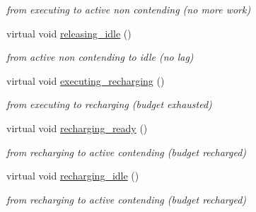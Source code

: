 \begin{DoxyCompactItemize}
\begin{DoxyCompactList}\small\item\em from executing to active non contending (no more work) \end{DoxyCompactList}\item 
virtual void \hyperlink{classRTSim_1_1PollingServer_acc8d9a98cd49bb715979e2f9a9b376b1}{releasing\+\_\+idle} ()\hypertarget{classRTSim_1_1PollingServer_acc8d9a98cd49bb715979e2f9a9b376b1}{}\label{classRTSim_1_1PollingServer_acc8d9a98cd49bb715979e2f9a9b376b1}

\begin{DoxyCompactList}\small\item\em from active non contending to idle (no lag) \end{DoxyCompactList}\item 
virtual void \hyperlink{classRTSim_1_1PollingServer_a4deb0880a4db27809b68c0cb978e23ed}{executing\+\_\+recharging} ()\hypertarget{classRTSim_1_1PollingServer_a4deb0880a4db27809b68c0cb978e23ed}{}\label{classRTSim_1_1PollingServer_a4deb0880a4db27809b68c0cb978e23ed}

\begin{DoxyCompactList}\small\item\em from executing to recharging (budget exhausted) \end{DoxyCompactList}\item 
virtual void \hyperlink{classRTSim_1_1PollingServer_a362ff5df3360c2cd2b1bcbdef1115cbe}{recharging\+\_\+ready} ()\hypertarget{classRTSim_1_1PollingServer_a362ff5df3360c2cd2b1bcbdef1115cbe}{}\label{classRTSim_1_1PollingServer_a362ff5df3360c2cd2b1bcbdef1115cbe}

\begin{DoxyCompactList}\small\item\em from recharging to active contending (budget recharged) \end{DoxyCompactList}\item 
virtual void \hyperlink{classRTSim_1_1PollingServer_a738af8d6f94081a8393a590298c81e0b}{recharging\+\_\+idle} ()\hypertarget{classRTSim_1_1PollingServer_a738af8d6f94081a8393a590298c81e0b}{}\label{classRTSim_1_1PollingServer_a738af8d6f94081a8393a590298c81e0b}

\begin{DoxyCompactList}\small\item\em from recharging to active contending (budget recharged) \end{DoxyCompactList}\end{DoxyCompactItemize}
